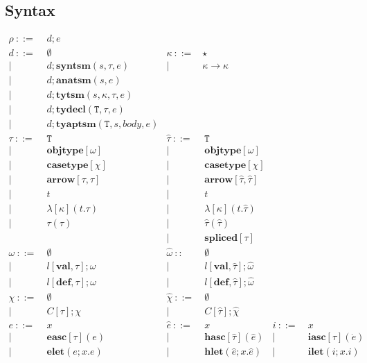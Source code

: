 \documentclass[letterpaper, notitlepage]{article}
\newcommand{\T}{\mathtt{T}}
\begin{document}
\subsection{Syntax}
\[
\begin{array}{rlrlrl}
	\rho		~::=&~ {d};e\\				
	{d}		~::=&~ \emptyset									&\kappa      ~::=& \star\\
				| ~	&~ {d}; \mathbf{syntsm}(s,\tau,e)			&| ~ & \kappa\rightarrow\kappa\\
				| ~	&~ {d}; \mathbf{anatsm}(s,e)				\\
				| ~	&~ {d};\mathbf{tytsm}(s,\kappa,\tau,e)				\\
				| ~ &~ {d};\mathbf{tydecl}(\T,\tau,e)			\\
				| ~ &~ {d};\mathbf{tyaptsm}(\T,s,body,e)			\\
	\tau 		~::=&~ \T				&\hat{\tau} ~::=&~ \T\\
				|~	& ~ \mathbf{objtype}[\omega]		&|~ &~ \mathbf{objtype}[\omega]				\\
				|~	& ~ \mathbf{casetype}[\chi]			&|~ &~ \mathbf{casetype}[\chi] 				\\
				|~ & ~ \mathbf{arrow}[\tau, \tau]		&|~ &~ \mathbf{arrow}[\hat\tau,\hat\tau] 	\\
				|~ & ~ t								&|~ &~ t 									\\
				|~ & ~ \lambda[\kappa](t.\tau)			&|~ &~ \lambda[\kappa](t.\hat{\tau})\\
				|~ & ~ \tau(\tau)						&|~ &~ \hat{\tau}(\hat{\tau})\\
				   &									&|~ &~ \mathbf{spliced}[\tau]\\
	\omega ~::=&~ 	\emptyset							&\hat{\omega} ~::&~ \emptyset\\
	 |~&  	~l[\mathbf{val}, \tau];\omega				&|~ & ~l[\mathbf{val}, \hat\tau];\hat\omega \\
	 |~&	~l[\mathbf{def}, \tau];\omega				&|~ & ~l[\mathbf{def}, \hat\tau];\hat\omega\\
	 \chi 			~::=&~	\emptyset					&\hat\chi ~::=&~	\emptyset\\
	 |~&	~C[\tau];\chi								&|~&  ~C[\hat\tau];\hat{\chi}\\
	e 			~::=&~ x 								&\hat{e}	~::=&~ 	x 										& i 		~::=&~ 	x\\
				| ~ &~ \mathbf{easc}[\tau](e)			& 		 	| ~ &~ 	\mathbf{hasc}[\hat\tau](\hat{e})		& 		 	| ~ &~	\mathbf{iasc}[\tau](\dot{e})\\
				| ~ &~ \mathbf{elet}(e; x.e)     		& 		 	| ~ &~ 	\mathbf{hlet}(\hat{e}; x.\hat{e})		& 		 	| ~ &~	\mathbf{ilet}(i;x.i)\\

\end{array}\]
\end{document}

